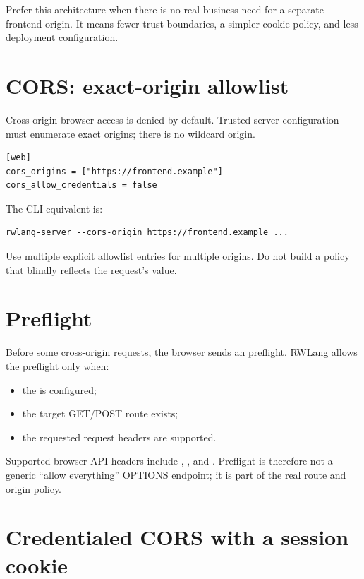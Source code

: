 Prefer this architecture when there is no real business need for a separate frontend origin. It means fewer trust boundaries, a simpler cookie policy, and less deployment configuration.

\section{CORS: exact-origin allowlist}

Cross-origin browser access is denied by default. Trusted server configuration must enumerate exact origins; there is no wildcard origin.

\begin{lstlisting}
[web]
cors_origins = ["https://frontend.example"]
cors_allow_credentials = false
\end{lstlisting}

The CLI equivalent is:

\begin{lstlisting}
rwlang-server --cors-origin https://frontend.example ...
\end{lstlisting}

Use multiple explicit allowlist entries for multiple origins. Do not build a policy that blindly reflects the request's  value.

\section{Preflight}

Before some cross-origin requests, the browser sends an  preflight. RWLang allows the preflight only when:

\begin{itemize}
  \item the  is configured;
  \item the target GET/POST route exists;
  \item the requested request headers are supported.
\end{itemize}

Supported browser-API headers include , , and . Preflight is therefore not a generic ``allow everything'' OPTIONS endpoint; it is part of the real route and origin policy.

\section{Credentialed CORS with a session cookie}

